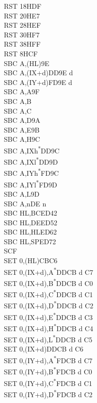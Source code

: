 \documentclass[twoside,openright,a4paper]{book}
\begin{document}
\begin{multicols}{3}
{\begin{tabbing}
	RST 18H\>DF\\
	RST 20H\>E7\\
	RST 28H\>EF\\
	RST 30H\>F7\\
	RST 38H\>FF\\
	RST 8H\>CF\\
	SBC A,(HL)\>9E\\
	SBC A,(IX+d)\>DD9E d\\
	SBC A,(IY+d)\>FD9E d\\
	SBC A,A\>9F\\
	SBC A,B\\
	SBC A,C\\
	SBC A,D\>9A\\
	SBC A,E\>9B\\
	SBC A,H\>9C\\
	SBC A,IXh\textsuperscript{*}\>DD9C\\
	SBC A,IXl\textsuperscript{*}\>DD9D\\
	SBC A,IYh\textsuperscript{*}\>FD9C\\
	SBC A,IYl\textsuperscript{*}\>FD9D\\
	SBC A,L\>9D\\
	SBC A,n\>DE n\\
	SBC HL,BC\>ED42\\
	SBC HL,DE\>ED52\\
	SBC HL,HL\>ED62\\
	SBC HL,SP\>ED72\\
	SCF\\
	SET 0,(HL)\>CBC6\\
	SET 0,(IX+d),A\textsuperscript{*}\>DDCB d C7\\
	SET 0,(IX+d),B\textsuperscript{*}\>DDCB d C0\\
	SET 0,(IX+d),C\textsuperscript{*}\>DDCB d C1\\
	SET 0,(IX+d),D\textsuperscript{*}\>DDCB d C2\\
	SET 0,(IX+d),E\textsuperscript{*}\>DDCB d C3\\
	SET 0,(IX+d),H\textsuperscript{*}\>DDCB d C4\\
	SET 0,(IX+d),L\textsuperscript{*}\>DDCB d C5\\
	SET 0,(IX+d)\>DDCB d C6\\
	SET 0,(IY+d),A\textsuperscript{*}\>FDCB d C7\\
	SET 0,(IY+d),B\textsuperscript{*}\>FDCB d C0\\
	SET 0,(IY+d),C\textsuperscript{*}\>FDCB d C1\\
	SET 0,(IY+d),D\textsuperscript{*}\>FDCB d C2\\

\end{tabbing}}
\end{multicols}
\end{document}

